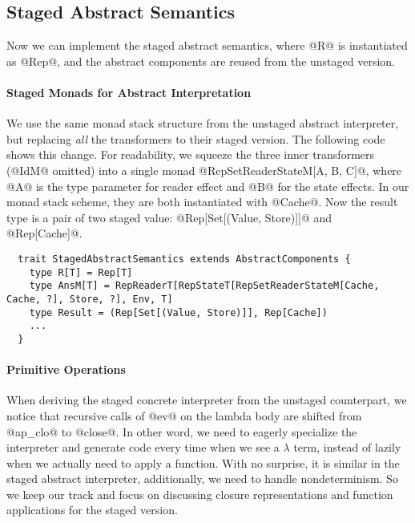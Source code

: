 \subsection{Staged Abstract Semantics}

Now we can implement the staged abstract semantics, where @R@ is instantiated as
@Rep@, and the abstract components are reused from the unstaged version.

\paragraph{Staged Monads for Abstract Interpretation}
We use the same monad stack structure from the unstaged abstract interpreter,
but replacing \textit{all} the transformers to their staged version. The
following code shows this change. For readability, we squeeze the three inner
transformers (@IdM@ omitted) into a single monad @RepSetReaderStateM[A, B, C]@,
where @A@ is the type parameter for reader effect and @B@ for the state effects.
In our monad stack scheme, they are both instantiated with @Cache@. Now the
result type is a pair of two staged value: @Rep[Set[(Value, Store)]]@ and
@Rep[Cache]@.

\begin{lstlisting}
  trait StagedAbstractSemantics extends AbstractComponents {
    type R[T] = Rep[T]
    type AnsM[T] = RepReaderT[RepStateT[RepSetReaderStateM[Cache, Cache, ?], Store, ?], Env, T]
    type Result = (Rep[Set[(Value, Store)]], Rep[Cache])
    ...
  }
\end{lstlisting}

\iffalse
Since our monad stack is uniformly using staged data, the staged @SetT@ now
stores a staged value of type @Rep[Set[A]]@, inside of another staged monad @M@.

\begin{lstlisting}
  case class SetT[M[_]: RepMonad, A](run: M[Set[A]]) {
    def flatMap[B: Manifest](f: Rep[A] => SetT[M, B]): SetT[M, B] = ...
  }
\end{lstlisting}
\fi

\paragraph{Primitive Operations} When deriving the staged concrete interpreter
from the unstaged counterpart, we notice that recursive calls of @ev@ on the
lambda body are shifted from @ap_clo@ to @close@. In other word, we need to
eagerly specialize the interpreter and generate code every time when we see a
$\lambda$ term, instead of lazily when we actually need to apply a function.
With no surprise, it is similar in the staged abstract interpreter,
additionally, we need to handle nondeterminism. So we keep our track and focus
on discussing closure representations and function applications for the staged
version.

